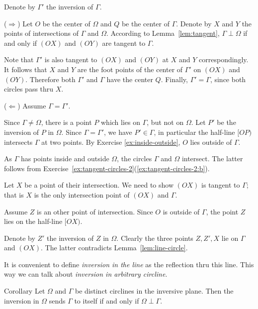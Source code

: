 Denote by $\Gamma'$ the inversion of $\Gamma$.

\parit{}($\Rightarrow$)
Let $O$ be the center of $\Omega$
and $Q$ be the center of $\Gamma$.
Denote by $X$ and $Y$ the points of intersections of  $\Gamma$ and $\Omega$.
According to Lemma~\ref{lem:tangent}, $\Gamma\perp\Omega$ if and only if $(OX)$ and $(OY)$ are tangent to $\Gamma$.

Note that $\Gamma'$ is also tangent to $(OX)$ and $(OY)$ at $X$ and $Y$ correspondingly. 
It follows that $X$ and $Y$ are the foot points of the center of $\Gamma'$ on $(OX)$ and $(OY)$.
Therefore both $\Gamma'$ and $\Gamma$ have the center $Q$.
Finally, $\Gamma'=\Gamma$, since both circles pass thru $X$.

\parit{}($\Leftarrow$)
Assume $\Gamma=\Gamma'$.

Since $\Gamma\ne \Omega$, there is a point $P$ which lies on $\Gamma$, but not on $\Omega$.
Let $P'$ be the inversion of $P$ in $\Omega$.
Since $\Gamma=\Gamma'$, we have $P'\in \Gamma$,
in particular the half-line $[OP)$ intersects $\Gamma$ at two points.
By Exercise \ref{ex:inside-outside}, 
 $O$ lies outside of $\Gamma$.

As $\Gamma$ has points inside and outside $\Omega$,
the circles $\Gamma$ and $\Omega$ intersect.
The latter follows from Exercise~\ref{ex:tangent-circles-2}(\ref{ex:tangent-circles-2:b}).

Let $X$ be a point of their intersection.
We need to show $(OX)$ is tangent to $\Gamma$;
that is $X$ is the only intersection point of $(OX)$ and $\Gamma$.

Assume $Z$ is an other point of intersection.
Since $O$ is outside of $\Gamma$, 
the point $Z$ lies on the half-line $[OX)$.

Denote by $Z'$ the inversion of $Z$ in $\Omega$.
Clearly the three points $Z, Z', X$ lie on $\Gamma$ and $(OX)$.
The latter  contradicts Lemma~\ref{lem:line-circle}.
\qeds 

It is convenient to define 
\emph{inversion in the line}
as the reflection thru this line.
This way we can talk about \emph{inversion in arbitrary circline}.


\begin{thm}{Corollary}\label{cor:perp-inverse-clines}
Let $\Omega$  and $\Gamma$ be distinct circlines in the inversive plane.
Then
the inversion in $\Omega$ sends $\Gamma$ to itself if and only if $\Omega\perp\Gamma$.
\end{thm}

